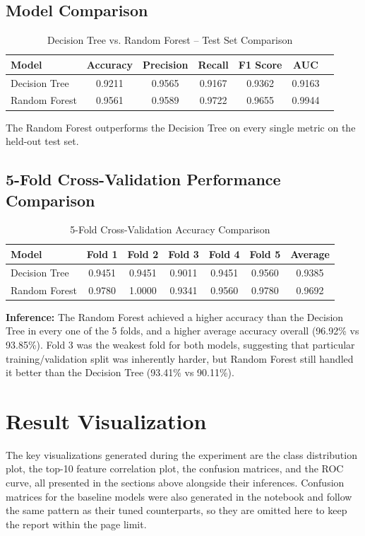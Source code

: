 \documentclass[12pt,a4paper]{article}
\begin{document}
\subsection{Model Comparison}
\begin{table}[H]
\centering
\caption{Decision Tree vs. Random Forest -- Test Set Comparison}
\begin{tabular}{lcccccc}
\toprule
Model & Accuracy & Precision & Recall & F1 Score & AUC \\
\midrule
Decision Tree & 0.9211 & 0.9565 & 0.9167 & 0.9362 & 0.9163 \\
Random Forest & 0.9561 & 0.9589 & 0.9722 & 0.9655 & 0.9944 \\
\bottomrule
\end{tabular}
\end{table}

The Random Forest outperforms the Decision Tree on every single metric on the held-out test set.

\subsection{5-Fold Cross-Validation Performance Comparison}
\begin{table}[H]
\centering
\caption{5-Fold Cross-Validation Accuracy Comparison}
\begin{tabular}{lcccccc}
\toprule
Model & Fold 1 & Fold 2 & Fold 3 & Fold 4 & Fold 5 & Average \\
\midrule
Decision Tree & 0.9451 & 0.9451 & 0.9011 & 0.9451 & 0.9560 & 0.9385 \\
Random Forest & 0.9780 & 1.0000 & 0.9341 & 0.9560 & 0.9780 & 0.9692 \\
\bottomrule
\end{tabular}
\end{table}

\textbf{Inference:} The Random Forest achieved a higher accuracy than the Decision Tree in every one of the 5 folds, and a higher average accuracy overall (96.92\% vs 93.85\%). Fold 3 was the weakest fold for both models, suggesting that particular training/validation split was inherently harder, but Random Forest still handled it better than the Decision Tree (93.41\% vs 90.11\%).

\section{Result Visualization}

The key visualizations generated during the experiment are the class distribution plot, the top-10 feature correlation plot, the confusion matrices, and the ROC curve, all presented in the sections above alongside their inferences. Confusion matrices for the baseline models were also generated in the notebook and follow the same pattern as their tuned counterparts, so they are omitted here to keep the report within the page limit.
\end{document}
